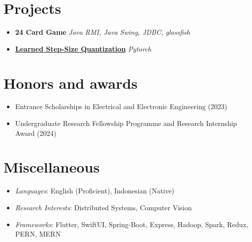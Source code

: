 \documentclass{cv}
\begin{document}
	\begin{adjustwidth}{}{\rightedge}
    \section*{Projects}
	\begin{itemize}
		\item {\textbf{24 Card Game}} \textit{Java RMI, Java Swing, JDBC, glassfish}
	    \item {\href{https://github.com/Nepranal/Learned-Step-Size-Quantization}{\textbf{Learned Step-Size Quantization}}} \textit{Pytorch}
    \end{itemize}
    \vspace{-0.2in}
    
    \section*{Honors and awards}
	\begin{itemize}
	    \item Entrance Scholarships in Electrical and Electronic Engineering (2023)
	    \item Undergraduate Research Fellowship Programme and Research Internship Award (2024)
    \end{itemize}
    \vspace{-0.2in}

    \section*{Miscellaneous}
    \begin{itemize}
        \item \textit{Languages}: English (Proficient), Indonesian (Native)
        \item \textit{Research Interests}: Distributed Systems, Computer Vision
        \item \textit{Frameworks}: Flutter, SwiftUI, Spring-Boot, Express, Hadoop, Spark, Redux, PERN, MERN
    \end{itemize}
    \end{adjustwidth}
\end{document}
